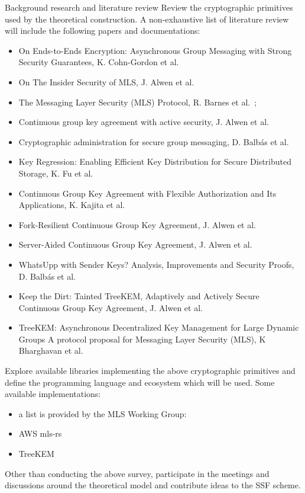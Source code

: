 \documentclass[E]{BAMASA}
\begin{document}
\tasks
\begin{workpackage}{Background research and literature review}\label{wp:background}
Review the cryptographic primitives used by the theoretical construction. A non-exhaustive list of literature review will include the following papers and documentations:
\begin{itemize}
    \item On Ends-to-Ends Encryption: Asynchronous Group Messaging with Strong Security Guarantees, K. Cohn-Gordon et al.~\cite{CCS:CCGMM18}
    \item On The Insider Security of MLS, J. Alwen et al.~\cite{CCS:AHKM22}
    \item The Messaging Layer Security (MLS) Protocol, R. Barnes et al.~\cite{rfc9420};
    \item Continuous group key agreement with active security, J. Alwen et al.~\cite{TCC:ACJM20}
    \item  Cryptographic administration for secure
group messaging, D. Balb\'as et al.~\cite{USENIX:BalColVau23}
    \item Key Regression: Enabling Efficient Key Distribution for Secure Distributed Storage, K. Fu et al.~\cite{NDSS:FuKamKoh06}
    \item Continuous Group Key Agreement with Flexible Authorization and Its Applications, K. Kajita et al.~\cite{IWSPA:KEONO23}
    \item Fork-Resilient Continuous Group Key Agreement, J. Alwen et al.~\cite{C:AlwMulTse23}
    \item Server-Aided Continuous Group Key Agreement, J. Alwen et al.~\cite{CCS:AHKM22}
    \item WhatsUpp with Sender Keys? Analysis, Improvements and Security Proofs, D. Balb\'as et al.~\cite{AC:BalColGaj23}
    \item Keep the Dirt: Tainted TreeKEM, Adaptively and Actively Secure Continuous Group Key Agreement, J. Alwen et al.~\cite{SP:KPWKCCMYAP21}
    \item TreeKEM: Asynchronous Decentralized Key Management for Large Dynamic Groups A protocol proposal for Messaging Layer Security (MLS), K Bharghavan et al.~\cite{TreeKEM}
\end{itemize} 

Explore available libraries implementing the above cryptographic primitives and define 
the programming language and ecosystem which will be used. 
Some available implementations:
\begin{itemize}
    \item a list is provided by the MLS Working Group:~\cite{MLSWGimpl}
    \item AWS mls-rs~\cite{AWSMLSrs}
    \item TreeKEM~\cite{TreeKEMimpl}
\end{itemize}

Other than conducting the above survey, participate in the meetings and discussions around the theoretical model and contribute ideas to the SSF scheme.

\end{workpackage}
\end{document}
